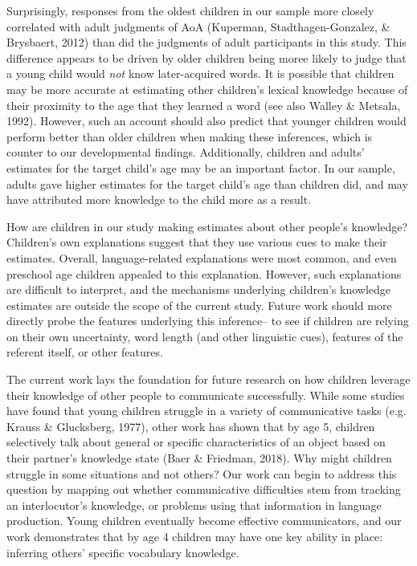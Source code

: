 \documentclass[10pt, letterpaper]{article}
\begin{document}
Surprisingly, responses from the oldest children in our sample more
closely correlated with adult judgments of AoA (Kuperman,
Stadthagen-Gonzalez, \& Brysbaert, 2012) than did the judgments of adult
participants in this study. This difference appears to be driven by
older children being moree likely to judge that a young child would
\emph{not} know later-acquired words. It is possible that children may
be more accurate at estimating other children's lexical knowledge
because of their proximity to the age that they learned a word (see also
Walley \& Metsala, 1992). However, such an account should also predict
that younger children would perform better than older children when
making these inferences, which is counter to our developmental findings.
Additionally, children and adults' estimates for the target child's age
may be an important factor. In our sample, adults gave higher estimates
for the target child's age than children did, and may have attributed
more knowledge to the child more as a result.

How are children in our study making estimates about other people's
knowledge? Children's own explanations suggest that they use various
cues to make their estimates. Overall, language-related explanations
were most common, and even preschool age children appealed to this
explanation. However, such explanations are difficult to interpret, and
the mechanisms underlying children's knowledge estimates are outside the
scope of the current study. Future work should more directly probe the
features underlying this inference-- to see if children are relying on
their own uncertainty, word length (and other linguistic cues), features
of the referent itself, or other features.

The current work lays the foundation for future research on how children
leverage their knowledge of other people to communicate successfully.
While some studies have found that young children struggle in a variety
of communicative tasks (e.g. Krauss \& Glucksberg, 1977), other work has
shown that by age 5, children selectively talk about general or specific
characteristics of an object based on their partner's knowledge state
(Baer \& Friedman, 2018). Why might children struggle in some situations
and not others? Our work can begin to address this question by mapping
out whether communicative difficulties stem from tracking an
interlocutor's knowledge, or problems using that information in language
production. Young children eventually become effective communicators,
and our work demonstrates that by age 4 children may have one key
ability in place: inferring others' specific vocabulary knowledge.
\end{document}
